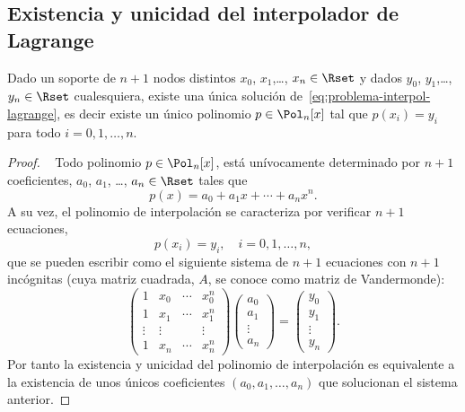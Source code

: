 \subsection{Existencia y unicidad del interpolador de Lagrange}
\label{sec:exist-y-unic-lagrange}

\begin{theorem}
  \label{thm:existencia-unicidad-lagrange}
  Dado un soporte de $n+1$ nodos distintos $x_0$, $x_1$,\dots, $x_n
  \in \Rset$ y dados $y_0$, $y_1$,\dots, $y_n\in\Rset$ cualesquiera,
  existe una única solución de~\eqref{eq:problema-interpol-lagrange},
  es decir existe un único polinomio $p\in\Pol_n[x]$ tal que
  $p(x_i)=y_i$ para todo $i=0,1,\dots,n$.
\end{theorem}
\begin{proof}~
  Todo polinomio $p\in\Pol_n[x]$, está unívocamente determinado por
  $n+1$ coeficientes, $a_0$, $a_1$, \dots, $a_n\in\Rset$ tales que
  \begin{equation}
    p(x)=a_0 + a_1 x + \cdots + a_n x^n.
  \end{equation}
  A su vez, el polinomio de interpolación se caracteriza por verificar
  $n+1$ ecuaciones,
  $$
  p(x_i)=y_i, \quad i=0,1,\dots,n,
  $$
  que se pueden escribir como el siguiente sistema de $n+1$ ecuaciones
  con $n+1$ incógnitas (cuya matriz cuadrada, $A$, se conoce como
  matriz de Vandermonde):
  \begin{equation}
    \begin{pmatrix}
      1 & x_0& \cdots & x_0^n \\
      1 & x_1& \cdots & x_1^n \\
      \vdots & \vdots & & \vdots \\
      1 & x_n& \cdots & x_n^n
    \end{pmatrix}
    \begin{pmatrix}
      a_0 \\ a_1 \\ \vdots \\ a_n
    \end{pmatrix}
    =
    \begin{pmatrix}
      y_0 \\ y_1 \\ \vdots \\ y_n
    \end{pmatrix}.
    \label{eq:sistema.Vandermonde}
  \end{equation}
  Por tanto la existencia y unicidad del polinomio de interpolación es
  equivalente a la existencia de unos únicos coeficientes
  $(a_0,a_1,\dots,a_n)$ que solucionan el sistema anterior.


\end{proof}
